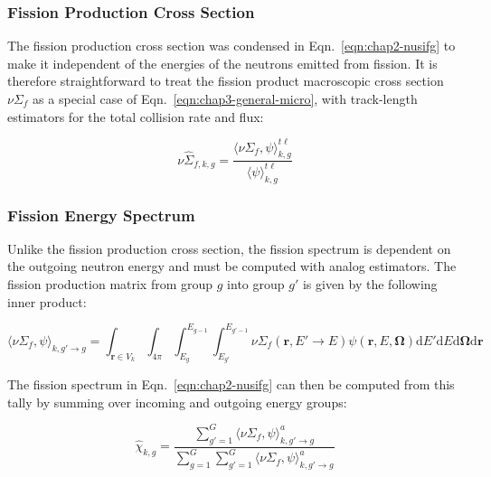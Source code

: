 \subsubsection{Fission Production Cross Section}
\label{subsubsec:chap3-tally-types-fiss-prod}

The fission production cross section was condensed in Eqn.~\ref{eqn:chap2-nusifg} to make it independent of the energies of the neutrons emitted from fission. It is therefore straightforward to treat the fission product macroscopic cross section $\nu\Sigma_{f}$ as a special case of Eqn.~\ref{eqn:chap3-general-micro}, with track-length estimators for the total collision rate and flux:

\begin{equation}
\label{eqn:chap3-nu-fiss-macro}
\nu\hat{\Sigma}_{f,k,g} = \frac{\langle \nu\Sigma_{f}, \psi \rangle_{k,g}^{t\ell}}{\langle \psi \rangle_{k,g}^{t\ell}}
\end{equation}


\subsubsection{Fission Energy Spectrum}
\label{subsubsec:chap3-tally-types-chi}

Unlike the fission production cross section, the fission spectrum is dependent on the outgoing neutron energy and must be computed with analog estimators. The fission production matrix from group $g$ into group $g'$ is given by the following inner product:

\begin{equation}
\label{eqn:chap3-nu-fiss-energies}
\langle \nu\Sigma_{f}, \psi \rangle_{k,g'\rightarrow g} = \int_{\mathbf{r} \in V_{k}} \int_{4\pi} \int_{E_{g}}^{E_{g-1}} \int_{E_{g'}}^{E_{g'-1}} \nu\Sigma_{f}(\mathbf{r},E'\rightarrow E)\psi(\mathbf{r},E,\mathbf{\Omega}) \mathrm{d}E'\mathrm{d}E\mathrm{d}\mathbf{\Omega}\mathrm{d}\mathbf{r}
\end{equation}

\noindent The fission spectrum in Eqn.~\ref{eqn:chap2-nusifg} can then be computed from this tally by summing over incoming and outgoing energy groups:

\begin{equation}
\label{eqn:chap3-nu-fiss-macro}
\hat{\chi}_{k,g} = \frac{\displaystyle\sum\limits_{g'=1}^{G} \langle \nu\Sigma_{f}, \psi \rangle_{k,g'\rightarrow g}^{a}}{\displaystyle\sum\limits_{g=1}^{G} \displaystyle\sum\limits_{g'=1}^{G} \langle \nu\Sigma_{f}, \psi \rangle_{k,g'\rightarrow g}^{a}}
\end{equation}

